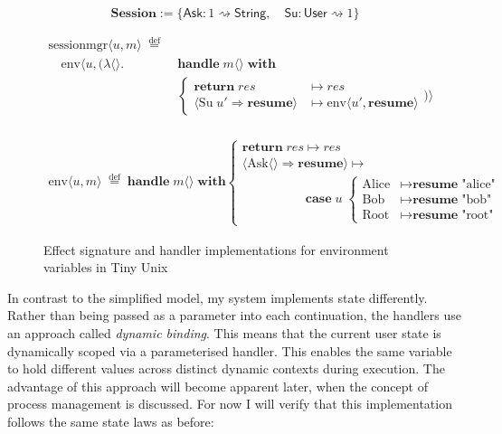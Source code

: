 \documentclass[logo,bsc,singlespacing,parskip]{infthesis}
\begin{document}
\begin{figure}[H]
\centering
\[
\mathsf{\textbf{Session}} := \{ \mathsf{Ask} : 1 \rightsquigarrow \mathsf{String}, \quad \mathsf{Su} : \mathsf{User} \rightsquigarrow 1 \}
\]

\vspace{-1em}

\begin{align*}
\text{sessionmgr} \langle u, m \rangle \;\overset{\mathrm{def}}{=}\;& \\
\quad \text{env} \langle u, (\lambda \langle \rangle.\; &\textbf{handle}\; m \langle \rangle\; \textbf{with} \\
&\left\{
\begin{array}{ll}
  \textbf{return}\; res & \mapsto res \\
  \langle \text{Su}\; u' \Rightarrow \textbf{resume} \rangle & \mapsto \text{env} \langle u', \textbf{resume} \rangle
\end{array}
\right.
) \rangle
\end{align*}

\vspace{-1em}
 
\[
\begin{array}{l}
\\
\text{env} \langle \mathit{u}, m \rangle \;\overset{\mathrm{def}}{=} \;
\textbf{handle}\; m \langle \rangle\; \textbf{with} \left\{
\begin{array}{ll}
\textbf{return}\; res  \mapsto res \\
\langle \text{Ask} \langle \rangle \Rightarrow \textbf{resume} \rangle  \mapsto \\
\quad\quad\quad\quad\quad\textbf{case}\; \mathit{u}\; \left\{
\begin{array}{ll}
\text{Alice} & \mapsto \textbf{resume}\; \text{"alice"} \\
\text{Bob} & \mapsto \textbf{resume}\; \text{"bob"} \\
\text{Root} & \mapsto \textbf{resume}\; \text{"root"}
\end{array}
\right.
\end{array}
\right.
\end{array}
\]

\caption{Effect signature and handler implementations for environment variables in Tiny Unix}
\label{fig:env-state-handler}
\end{figure}

In contrast to the simplified model, my system implements state differently. Rather than being passed as a parameter into each continuation, the handlers use an approach called \textit{dynamic binding}. This means that the current user state is dynamically scoped via a parameterised handler. This enables the same variable to hold different values across distinct dynamic contexts during execution. The advantage of this approach will become apparent later, when the concept of process management is discussed. For now I will verify that this implementation follows the same state laws as before:
\end{document}

